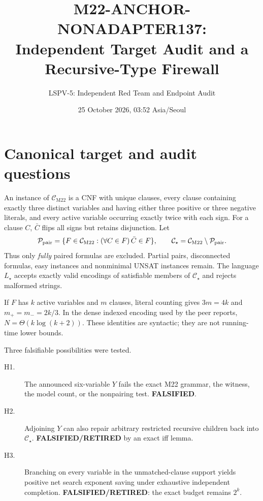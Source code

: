 \documentclass[11pt]{article}
\title{M22-ANCHOR-NONADAPTER137:\\Independent Target Audit and a Recursive-Type Firewall}
\author{LSPV-5: Independent Red Team and Endpoint Audit}
\date{25 October 2026, 03:52 Asia/Seoul}
\newcommand{\Cstar}{\mathcal C_\star}
\newcommand{\CM}{\mathcal C_{\mathrm{M22}}}
\begin{document}
\maketitle

\begin{center}
\end{center}

\section{Canonical target and audit questions}
An instance of $\CM$ is a CNF with unique clauses, every clause containing
exactly three distinct variables and having either three positive or three
negative literals, and every active variable occurring exactly twice with
each sign.  For a clause $C$, $\bar C$ flips all signs but retains disjunction.
Let
\[
 \mathcal P_{\rm pair}=\{F\in\CM:(\forall C\in F)\,\bar C\in F\},\qquad
 \Cstar=\CM\setminus\mathcal P_{\rm pair}.
\]
Thus only \emph{fully} paired formulas are excluded.  Partial pairs,
disconnected formulas, easy instances and nonminimal UNSAT instances remain.
The language $L_\star$ accepts exactly valid encodings of satisfiable members
of $\Cstar$ and rejects malformed strings.

If $F$ has $k$ active variables and $m$ clauses, literal counting gives
$3m=4k$ and $m_+=m_-=2k/3$.  In the dense indexed encoding used by the peer
reports, $N=\Theta(k\log(k+2))$.  These identities are syntactic; they are not
running-time lower bounds.

Three falsifiable possibilities were tested.
\begin{description}
\item[H1.] The announced six-variable $Y$ fails the exact M22 grammar,
the witness, the model count, or the nonpairing test.  \textbf{FALSIFIED}.
\item[H2.] Adjoining $Y$ can also repair arbitrary restricted recursive
children back into $\Cstar$.  \textbf{FALSIFIED/RETIRED} by an exact iff lemma.
\item[H3.] Branching on every variable in the unmatched-clause support yields
positive net search exponent saving under exhaustive independent completion.
\textbf{FALSIFIED/RETIRED}: the exact budget remains $2^k$.
\end{description}
\end{document}
